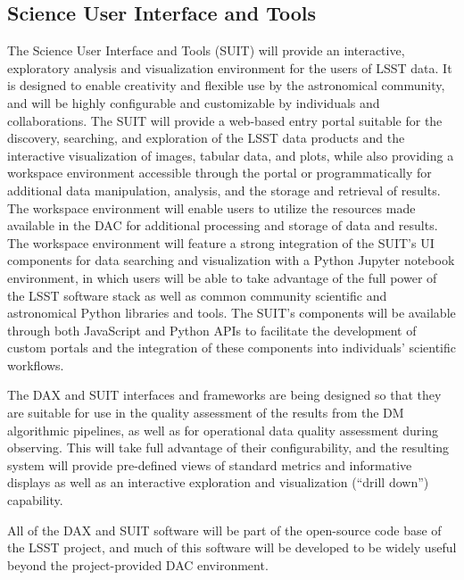 \subsection{Science User Interface and Tools}

The Science User Interface and Tools (SUIT) will provide an interactive, exploratory analysis and visualization
environment for the users of LSST data. It is designed to enable creativity and flexible use by the astronomical
community, and will be highly configurable and customizable by individuals and collaborations. The SUIT will
provide a web-based entry portal suitable for the discovery, searching, and exploration of the LSST data products
and the interactive visualization of images, tabular data, and plots, while also providing a workspace environment
accessible through the portal or programmatically for additional data manipulation, analysis, and the storage and
retrieval of results. The workspace environment will enable users to utilize the resources made available in the
DAC for additional processing and storage of data and results. The workspace environment will feature a strong
integration of the SUIT's UI components for data searching and visualization with a Python Jupyter notebook
environment, in which users will be able to take advantage of the full power of the LSST software stack as well as
common community scientific and astronomical Python libraries and tools. The SUIT's components will be available
through both JavaScript and Python APIs to facilitate the development of
custom portals and the integration of these components into individuals' scientific workflows.

The DAX and SUIT interfaces and frameworks are being designed so that they are suitable for use in the quality
assessment of the results from the DM algorithmic pipelines, as well as for operational data quality assessment
during observing. This will take full advantage of their configurability, and the resulting system will provide
pre-defined views of standard metrics and informative displays as well as an interactive exploration and
visualization (``drill down'') capability.

All of the DAX and SUIT software will be part of the open-source code base of the LSST project, and much of this
software will be developed to be widely useful beyond the project-provided DAC environment.

